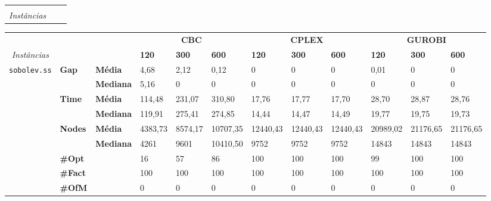 
\begin{table}[]
	\begin{adjustbox}{angle=90}
	\begin{tabular}{cll}
	& & &	\\\textit{Instâncias} & & \\
	\end{tabular}
	\end{adjustbox}
\end{table}


\begin{table}[]
	\begin{adjustbox}{angle=90}
	\begin{tabular}{cll|lll|lll|lll}
	& & & \multicolumn{3}{c}{\textbf{CBC}} & \multicolumn{3}{c}{\textbf{CPLEX}} & \multicolumn{3}{c}{\textbf{GUROBI}} 	\\\textit{Instâncias} & & & \textbf{120} & \textbf{300} & \textbf{600} & \textbf{120} & \textbf{300} & \textbf{600} & \textbf{120} & \textbf{300} & \textbf{600} \\
\hline
\multirow{7}{*}{\texttt{sobolev.ss}} & \multirow{2}{*}{\textbf{Gap}} & \textbf{Média} & 4,68 & 2,12 & 0,12 & 0 & 0 & 0 & 0,01 & 0 & 0 \\
 & & \textbf{Mediana} & 5,16 & 0 & 0 & 0 & 0 & 0 & 0 & 0 & 0 \\
\cline{2-12}
 & \multirow{2}{*}{\textbf{Time}} & \textbf{Média} & 114,48 & 231,07 & 310,80 & 17,76 & 17,77 & 17,70 & 28,70 & 28,87 & 28,76 \\
 & & \textbf{Mediana} & 119,91 & 275,41 & 274,85 & 14,44 & 14,47 & 14,49 & 19,77 & 19,75 & 19,73 \\
\cline{2-12}
 & \multirow{2}{*}{\textbf{Nodes}} & \textbf{Média} & 4383,73 & 8574,17 & 10707,35 & 12440,43 & 12440,43 & 12440,43 & 20989,02 & 21176,65 & 21176,65 \\
 & & \textbf{Mediana} & 4261 & 9601 & 10410,50 & 9752 & 9752 & 9752 & 14843 & 14843 & 14843 \\
\cline{2-12}
 & \textbf{\#Opt} & & 16 & 57 & 86 & 100 & 100 & 100 & 99 & 100 & 100 \\
 & \textbf{\#Fact} & & 100 & 100 & 100 & 100 & 100 & 100 & 100 & 100 & 100 \\
 & \textbf{\#OfM} & & 0 & 0 & 0 & 0 & 0 & 0 & 0 & 0 & 0 \\

\end{tabular}
\end{adjustbox}
\end{table}
